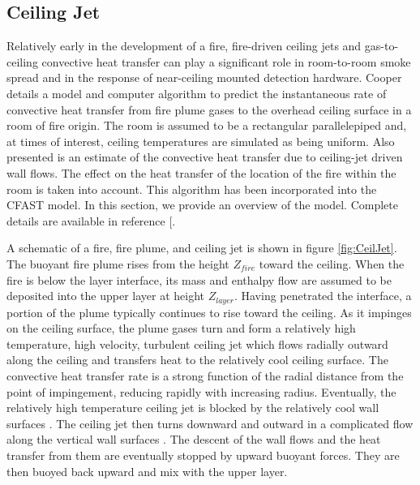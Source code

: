 \subsection{Ceiling Jet}

Relatively early in the development of a fire, fire-driven ceiling jets and gas-to-ceiling convective heat transfer can play a significant role in room-to-room smoke spread and in the response of near-ceiling mounted detection hardware.  Cooper \cite{Cooper:1991} details a model and computer algorithm to predict the instantaneous rate of convective heat transfer from fire plume gases to the overhead ceiling surface in a room of fire origin.  The room is assumed to be a rectangular parallelepiped and, at times of interest, ceiling temperatures are simulated as being uniform.  Also presented is an estimate of the convective heat transfer due to ceiling-jet driven wall flows.  The effect on the heat transfer of the location of the fire within the room is taken into account.  This algorithm has been incorporated into the CFAST model.  In this section, we provide an overview of the model.  Complete details are available in reference [\cite{Cooper:1991}.

A schematic of a fire, fire plume, and ceiling jet is shown in figure \ref{fig:CeilJet}. The buoyant fire plume rises from the height $Z_{fire}$ toward the ceiling.  When the fire is below the layer interface, its mass and enthalpy flow are assumed to be deposited into the upper layer at height $Z_{layer}$.  Having penetrated the interface, a portion of the plume typically continues to rise toward the ceiling.  As it impinges on the ceiling surface, the plume gases turn and form a relatively high temperature, high velocity, turbulent ceiling jet which flows radially outward along the ceiling and transfers heat to the relatively cool ceiling surface.  The convective heat transfer rate is a strong function of the radial distance from the point of impingement, reducing rapidly with increasing radius.  Eventually, the relatively high temperature ceiling jet is blocked by the relatively cool wall surfaces \cite{Cooper:1990a}.  The ceiling jet then turns downward and outward in a complicated flow along the vertical wall surfaces \cite{Cooper:1988, Jaluria:1989} .  The descent of the wall flows and the heat transfer from them are eventually stopped by upward buoyant forces.  They are then buoyed back upward and mix with the upper layer.


